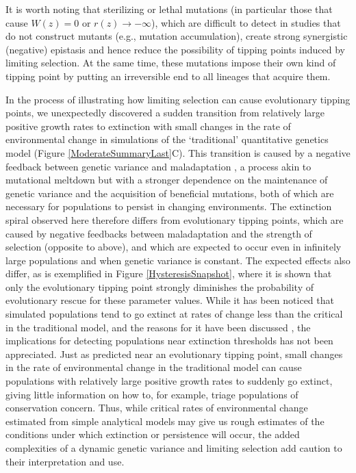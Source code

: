 \documentclass[12pt,letterpaper]{article} %
\begin{document}
It is worth noting that sterilizing or lethal mutations (in particular those that cause $W(z)=0$ or $r(z)\rightarrow-\infty$), which are difficult to detect in studies that do not construct mutants (e.g., mutation accumulation), create strong synergistic (negative) epistasis \citep[e.g.,][]{Lalic2012} and hence reduce the possibility of tipping points induced by limiting selection.
At the same time, these mutations impose their own kind of tipping point by putting an irreversible end to all lineages that acquire them. 

In the process of illustrating how limiting selection can cause evolutionary tipping points, we unexpectedly discovered a sudden transition from relatively large positive growth rates to extinction with small changes in the rate of environmental change in simulations of the `traditional' quantitative genetics model (Figure \ref{ModerateSummaryLast}C).
This transition is caused by a negative feedback between genetic variance and maladaptation \citep{Burger1995}, a process akin to mutational meltdown \citep[][]{Lynch1990} but with a stronger dependence on the maintenance of genetic variance and the acquisition of beneficial mutations, both of which are necessary for populations to persist in changing environments. 
The extinction spiral observed here therefore differs from evolutionary tipping points, which are caused by negative feedbacks between maladaptation and the strength of selection (opposite to above), and which are expected to occur even in infinitely large populations and when genetic variance is constant.
The expected effects also differ, as is exemplified in Figure \ref{HysteresisSnapshot}, where it is shown that only the evolutionary tipping point strongly diminishes the probability of evolutionary rescue for these parameter values.
While it has been noticed that simulated populations tend to go extinct at rates of change less than the critical in the traditional model, and the reasons for it have been discussed \citep{Burger1995}, the implications for detecting populations near extinction thresholds has not been appreciated.
Just as predicted near an evolutionary tipping point, small changes in the rate of environmental change in the traditional model can cause populations with relatively large positive growth rates to suddenly go extinct, giving little information on how to, for example, triage populations of conservation concern.
Thus, while critical rates of environmental change estimated from simple analytical models may give us rough estimates of the conditions under which extinction or persistence will occur, the added complexities of a dynamic genetic variance and limiting selection add caution to their interpretation and use.
    
\end{document}
